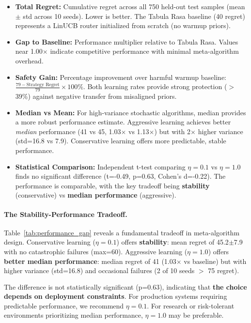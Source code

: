 \begin{table}[t]
\begin{itemize}[leftmargin=*,nosep]
\item \textbf{Total Regret:} Cumulative regret across all 750 held-out test samples (mean $\pm$ std across 10 seeds). Lower is better. The Tabula Rasa baseline (40 regret) represents a LinUCB router initialized from scratch (no warmup priors).

\item \textbf{Gap to Baseline:} Performance multiplier relative to Tabula Rasa. Values near 1.00$\times$ indicate competitive performance with minimal meta-algorithm overhead.

\item \textbf{Safety Gain:} Percentage improvement over harmful warmup baseline: $\frac{79 - \text{Strategy Regret}}{79} \times 100\%$. Both learning rates provide strong protection ($>$39\%) against negative transfer from misaligned priors.

\item \textbf{Median vs Mean:} For high-variance stochastic algorithms, median provides a more robust performance estimate. Aggressive learning achieves better \emph{median} performance (41 vs 45, 1.03$\times$ vs 1.13$\times$) but with 2$\times$ higher variance (std=16.8 vs 7.9). Conservative learning offers more predictable, stable performance.

\item \textbf{Statistical Comparison:} Independent t-test comparing $\eta=0.1$ vs $\eta=1.0$ finds no significant difference (t=-0.49, p=0.63, Cohen's d=-0.22). The performance is comparable, with the key tradeoff being \textbf{stability} (conservative) vs \textbf{median performance} (aggressive).
\end{itemize}

\vspace{0.5em}
\paragraph{The Stability-Performance Tradeoff.}
Table~\ref{tab:performance_gap} reveals a fundamental tradeoff in meta-algorithm design. Conservative learning ($\eta=0.1$) offers \textbf{stability}: mean regret of 45.2$\pm$7.9 with no catastrophic failures (max=60). Aggressive learning ($\eta=1.0$) offers \textbf{better median performance}: median regret of 41 (1.03$\times$ vs baseline) but with higher variance (std=16.8) and occasional failures (2 of 10 seeds $>$ 75 regret). 

The difference is not statistically significant (p=0.63), indicating that \textbf{the choice depends on deployment constraints}. For production systems requiring predictable performance, we recommend $\eta=0.1$. For research or risk-tolerant environments prioritizing median performance, $\eta=1.0$ may be preferable.


\end{table}
